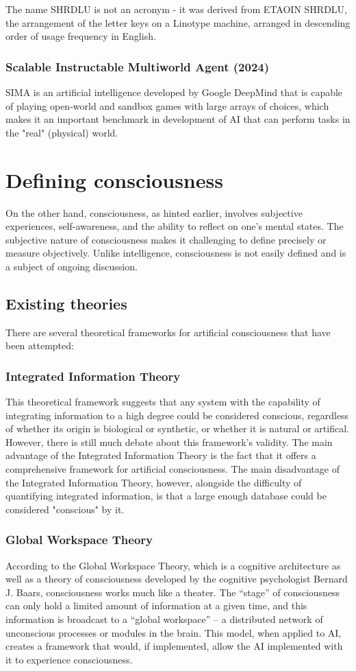 \documentclass[masterthesis]{fer}
\begin{document}
The name SHRDLU is not an acronym - it was derived from ETAOIN SHRDLU, the arrangement of the letter keys on a Linotype machine, arranged in descending order of usage frequency in English.

\subsubsection{Scalable Instructable Multiworld Agent (2024)}
SIMA is an artificial intelligence developed by Google DeepMind that is capable of playing open-world and sandbox games with large arrays of choices, which makes it an important benchmark in development of AI that can perform tasks in the "real" (physical) world.


\section{Defining consciousness}
On the other hand, consciousness, as hinted earlier,  involves subjective experiences, self-awareness, and the ability to reflect on one's mental states. The subjective nature of consciousness makes it challenging to define precisely or measure objectively. 
Unlike intelligence, consciousness is not easily defined and is a subject of ongoing discussion.
\subsection{Existing theories}
There are several theoretical frameworks for artificial consciousness that have been attempted:
\subsubsection{Integrated Information Theory}
This theoretical framework suggests that any system with the capability of integrating information to a high degree could be considered conscious, regardless of whether its origin is biological or synthetic, or whether it is natural or artifical. However, there is still much debate about this framework's validity.
The main advantage of the Integrated Information Theory is the fact that it offers a comprehensive framework for artificial consciousness.
The main disadvantage of the Integrated Information Theory, however, alongside the difficulty of quantifying integrated information, is that a large enough database could be considered "conscious" by it.
\subsubsection{Global Workspace Theory}
According to the Global Workspace Theory, which is a cognitive architecture as well as a theory of consciousness developed by the cognitive psychologist Bernard J. Baars, consciousness works much like a theater.
The “stage” of consciousness can only hold a limited amount of information at a given time, and this information is broadcast to a “global workspace” – a distributed network of unconscious processes or modules in the brain.
This model, when applied to AI, creates a framework that would, if implemented, allow the AI implemented with it to experience consciousness.
\end{document}
